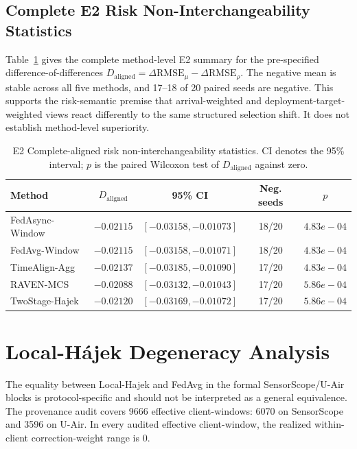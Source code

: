 \subsection{Complete E2 Risk Non-Interchangeability Statistics}
\label{app:e2_full_stats}

Table~\ref{tab:app_e2_daligned} gives the complete method-level E2 summary for
the pre-specified difference-of-differences
$D_{\mathrm{aligned}}=\Delta\mathrm{RMSE}_{\mu}
-\Delta\mathrm{RMSE}_{\rho}$.  The negative mean is stable across all five
methods, and 17--18 of 20 paired seeds are negative.  This supports the
risk-semantic premise that arrival-weighted and deployment-target-weighted
views react differently to the same structured selection shift.  It does not
establish method-level superiority.

\begin{table}[!t]
\centering
\caption{E2 Complete-aligned risk non-interchangeability statistics.
CI denotes the 95\% interval; $p$ is the paired Wilcoxon test of
$D_{\mathrm{aligned}}$ against zero.}
\label{tab:app_e2_daligned}
\scriptsize
\setlength{\tabcolsep}{2.5pt}
\begin{tabular*}{\columnwidth}{@{\extracolsep{\fill}}lcccc}
\toprule
Method & $D_{\mathrm{aligned}}$ & 95\% CI & Neg. seeds & $p$\\
\midrule
FedAsync-Window & $-0.02115$ & $[-0.03158,-0.01073]$ & 18/20 & $4.83e-04$ \\
FedAvg-Window & $-0.02115$ & $[-0.03158,-0.01071]$ & 18/20 & $4.83e-04$ \\
TimeAlign-Agg & $-0.02137$ & $[-0.03185,-0.01090]$ & 17/20 & $4.83e-04$ \\
RAVEN-MCS & $-0.02088$ & $[-0.03132,-0.01043]$ & 17/20 & $5.86e-04$ \\
TwoStage-Hajek & $-0.02120$ & $[-0.03169,-0.01072]$ & 17/20 & $5.86e-04$ \\
\bottomrule
\end{tabular*}
\end{table}


\section{Local-H\'ajek Degeneracy Analysis}
\label{app:local_hajek}

The equality between Local-Hajek and FedAvg in the formal SensorScope/U-Air
blocks is protocol-specific and should not be interpreted as a general
equivalence.  The provenance audit covers
9666 effective client-windows: 6070 on SensorScope and
3596 on U-Air.  In every audited effective client-window, the realized
within-client correction-weight range is 0.

